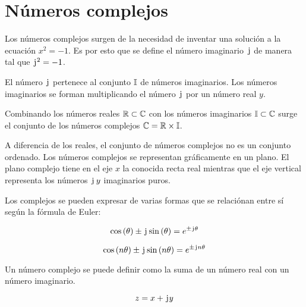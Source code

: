 \chapter{Números complejos}

Los números complejos surgen de la necesidad de inventar una solución a la ecuación $x^2=-1$.
Es por esto que se define el número imaginario $\mkern2mu\mathrm{j}\mkern1mu$ de manera tal que $\mkern2mu\mathrm{j}\mkern1mu^2=-1$.

El número $\mkern2mu\mathrm{j}\mkern1mu$ pertenece al conjunto $\mathbb{I}$ de números imaginarios.
Los números imaginarios se forman multiplicando el número $\mkern2mu\mathrm{j}\mkern1mu$ por un número real $y$.

Combinando los números reales $\mathbb{R} \subset \mathbb{C}$ con los números imaginarios $\mathbb{I} \subset \mathbb{C}$ surge el conjunto de los números complejos $\mathbb{C}=\mathbb{R} \times \mathbb{I}$.

A diferencia de los reales, el conjunto de números complejos no es un conjunto ordenado.
Los números complejos se representan gráficamente en un plano.
El plano complejo tiene en el eje $x$ la conocida recta real mientras que el eje vertical representa los números $\mkern2mu\mathrm{j}\mkern1mu \, y$ imaginarios puros.

Los complejos se pueden expresar de varias formas que se relaciónan entre sí según la fórmula de Euler:

\begin{mdframed}[style=PropertyFrame]
    \begin{prop}
        \label{prop:EulerFormula}
    \end{prop}
    \begin{equation*}
        \cos{(\theta)} \pm \mkern2mu\mathrm{j}\mkern1mu \sin{(\theta)} = e^{\pm \mkern2mu\mathrm{j}\mkern1mu \theta}
    \end{equation*}
\end{mdframed}

\begin{mdframed}[style=PropertyFrame]
    \begin{prop}
    \end{prop}
    \begin{equation*}
        \cos{(n \theta)} \pm \mkern2mu\mathrm{j}\mkern1mu \sin{(n \theta)} = e^{\pm \mkern2mu\mathrm{j}\mkern1mu n \theta}
    \end{equation*}
\end{mdframed}

Un número complejo se puede definir como la suma de un número real con un número imaginario.

\begin{mdframed}[style=DefinitionFrame]
    \begin{defn}
        \label{defn:BinomialForm}
    \end{defn}
    \begin{equation*}
        z = x + \mkern2mu\mathrm{j}\mkern1mu y
    \end{equation*}
\end{mdframed}

